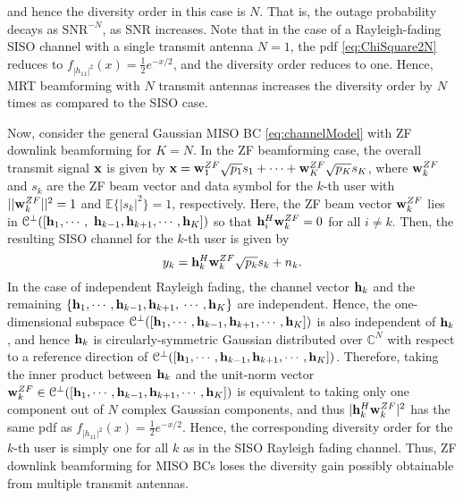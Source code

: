 \documentclass[11pt, draft, onecolumn ]{IEEEtran}
\newcommand {\Ebb}{{\mathbb{E}}}
\begin{document}
 and hence the diversity order in this case is  $N$.  That is, the outage probability decays as $\mathrm{SNR}^{-N}$, as SNR increases. Note that in the case of a Rayleigh-fading SISO channel with a single transmit antenna $N=1$, the pdf \eqref{eq:ChiSquare2N} reduces to
$f_{|h_{11}|^2}(x)= \frac{1}{2}e^{-x/2}$,
and the diversity order reduces to one. Hence, MRT beamforming with $N$ transmit antennas  increases the diversity order by $N$ times as compared to the SISO case.





Now, consider the general  Gaussian MISO BC \eqref{eq:channelModel} with ZF downlink beamforming for $K=N$.  In the ZF beamforming case, the overall transmit signal ${\bf x}$ is given by
${\bf x} = {\bf w}_1^{ZF} \sqrt{p_1}s_1 + \cdots + {\bf w}_K^{ZF} \sqrt{p_K}s_K$,
where ${\bf w}_k^{ZF}$ and $s_k$ are the ZF beam vector and data symbol for the $k$-th user with $||{\bf w}_k^{ZF}||^2=1$ and $\Ebb\{|s_k|^2\}=1$, respectively. Here, the ZF beam vector ${\bf w}_k^{ZF}$ lies in ${\cal C}^\perp([{\bf h}_1,\cdots,$ ${\bf h}_{k-1},{\bf h}_{k+1},\cdots,{\bf h}_K])$
so that ${\bf h}_i^H {\bf w}_k^{ZF} =0$ for all $i \ne k$. Then, the resulting  SISO channel for the $k$-th user is given by
\begin{equation}  \label{eq:ZFsisoEQ}
y_k = {\bf h}_k^H {\bf w}_k^{ZF} \sqrt{p_k} s_k + n_k.
\end{equation}
In the case of independent Rayleigh fading, the channel vector ${\bf h}_k$ and the remaining  $\{ {\bf h}_1,\cdots,{\bf h}_{k-1},{\bf h}_{k+1},$  $\cdots,{\bf h}_K\}$ are independent. Hence, the one-dimensional subspace ${\cal C}^\perp([{\bf h}_1,\cdots,{\bf h}_{k-1},{\bf h}_{k+1},\cdots,{\bf h}_K])$ is also   independent of ${\bf h}_k$, and hence ${\bf h}_k$ is circularly-symmetric Gaussian distributed over ${\mathbb{C}}^N$ with respect to a reference direction of  ${\cal C}^\perp([{\bf h}_1,\cdots,{\bf h}_{k-1},{\bf h}_{k+1},\cdots,{\bf h}_K])$.  Therefore,  taking the inner product between ${\bf h}_k$ and the unit-norm vector ${\bf w}_k^{ZF} \in {\cal C}^\perp([{\bf h}_1,\cdots,{\bf h}_{k-1},{\bf h}_{k+1},\cdots,{\bf h}_K])$ is equivalent to taking only one component out of $N$ complex Gaussian components, and thus  $|{\bf h}_k^H{\bf w}_k^{ZF}|^2$ has the same pdf as  $f_{|h_{11}|^2}(x)= \frac{1}{2}e^{-x/2}$. Hence,
the corresponding diversity order for  the $k$-th user is simply one for all $k$\cite{Chen&Ding&Dai:16Access} as in the SISO Rayleigh fading channel.  Thus, ZF downlink beamforming for MISO BCs loses the diversity gain possibly obtainable from multiple transmit antennas.
\end{document}
